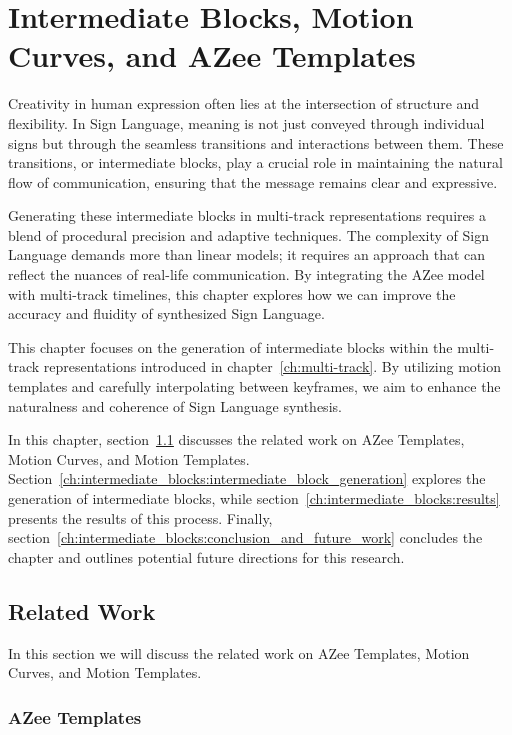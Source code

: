 \documentclass[../../main.tex]{subfiles}
\begin{document}
\chapter{Intermediate Blocks, Motion Curves, and AZee Templates}
\label{ch:intermediate_blocks}

Creativity in human expression often lies at the intersection of structure and flexibility. In Sign Language, meaning is not just conveyed through individual signs but through the seamless transitions and interactions between them. These transitions, or intermediate blocks, play a crucial role in maintaining the natural flow of communication, ensuring that the message remains clear and expressive.

Generating these intermediate blocks in multi-track representations requires a blend of procedural precision and adaptive techniques. The complexity of Sign Language demands more than linear models; it requires an approach that can reflect the nuances of real-life communication. By integrating the AZee model with multi-track timelines, this chapter explores how we can improve the accuracy and fluidity of synthesized Sign Language.

This chapter focuses on the generation of intermediate blocks within the multi-track representations introduced in chapter~\ref{ch:multi-track}. By utilizing motion templates and carefully interpolating between keyframes, we aim to enhance the naturalness and coherence of Sign Language synthesis.

In this chapter, section~\ref{ch:intermediate_blocks:related_work} discusses the related work on AZee Templates, Motion Curves, and Motion Templates. Section~\ref{ch:intermediate_blocks:intermediate_block_generation} explores the generation of intermediate blocks, while section~\ref{ch:intermediate_blocks:results} presents the results of this process. Finally, section~\ref{ch:intermediate_blocks:conclusion_and_future_work} concludes the chapter and outlines potential future directions for this research.

\section{Related Work}
\label{ch:intermediate_blocks:related_work}

In this section we will discuss the related work on AZee Templates, Motion Curves, and Motion Templates. 

\subsection{AZee Templates}
\label{ch:intermediate_blocks:related_work:azee_templates}
\end{document}

